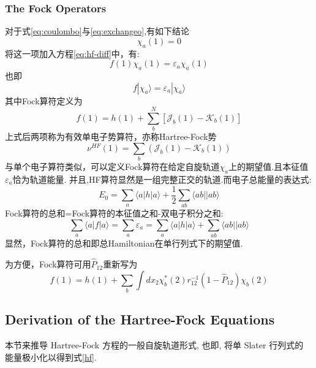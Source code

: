\documentclass[fontset=none,12pt,a4paper]{ctexart}
\numberwithin{equation}{section}
\begin{document}
\subsubsection{The Fock Operators}
对于式\ref{eq:coulombo}与\ref{eq:exchangeo},有如下结论
\begin{equation}
  [\mathcal{J}_a(1)-\mathcal{K}_a(1)]\chi_a(1)=0
\end{equation}
将这一项加入方程\eqref{eq:hf-diff}中，有:
\begin{equation}
  f(1)\chi_a(1)=\varepsilon_a\chi_a(1)
\end{equation}
也即
\begin{equation}
  f|\chi_a\rangle=\varepsilon_a|\chi_a\rangle
  \label{hf}
\end{equation}
其中Fock算符定义为
\begin{equation}
  f(1)=h(1)+\sum_b^{N}[\mathcal{J}_b(1)-\mathcal{K}_b(1)]
\end{equation}
上式后两项称为有效单电子势算符，亦称Hartree-Fock势
\begin{equation}
  \nu^{HF}(1)=\sum_b( \mathcal{J}_b(1)-\mathcal{K}_b(1))
\end{equation}
与单个电子算符类似，可以定义Fock算符在给定自旋轨道$\chi_a$上的期望值.且本征值$\varepsilon_a$恰为轨道能量.
并且,HF算符显然是一组完整正交的轨道.而电子总能量的表达式:
\begin{equation}
  E_0=\sum_a\langle a|h|a\rangle+\frac{1}{2}\sum_{ab}\langle ab||ab\rangle
\end{equation}
Fock算符的总和=Fock算符的本征值之和-双电子积分之和:
\begin{equation}
  \sum_a\langle a|f|a\rangle=\sum_a\varepsilon_a=\sum_a\langle a|h|a\rangle+\sum_{ab}\langle ab||ab\rangle
\end{equation}
显然，Fock算符的总和即总Hamiltonian在单行列式下的期望值.

为方便，Fock算符可用$\hat{P}_{12}$重新写为
\begin{equation}
  f(1)=h(1)+\sum_b\int dx_2\chi_b^*(2)r_{12}^{-1}(1-\hat{P}_{12})\chi_b(2)
\end{equation}
\subsection{Derivation of the Hartree-Fock Equations}
本节来推导 Hartree-Fock 方程的一般自旋轨道形式, 也即, 将单 Slater 行列式的 能量极小化以得到式\ref{hf}.
\end{document}
